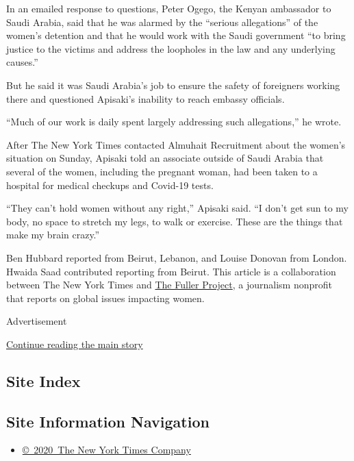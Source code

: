 In an emailed response to questions, Peter Ogego, the Kenyan ambassador
to Saudi Arabia, said that he was alarmed by the ``serious allegations''
of the women's detention and that he would work with the Saudi
government ``to bring justice to the victims and address the loopholes
in the law and any underlying causes.''

But he said it was Saudi Arabia's job to ensure the safety of foreigners
working there and questioned Apisaki's inability to reach embassy
officials.

``Much of our work is daily spent largely addressing such allegations,''
he wrote.

After The New York Times contacted Almuhait Recruitment about the
women's situation on Sunday, Apisaki told an associate outside of Saudi
Arabia that several of the women, including the pregnant woman, had been
taken to a hospital for medical checkups and Covid-19 tests.

``They can't hold women without any right,'' Apisaki said. ``I don't get
sun to my body, no space to stretch my legs, to walk or exercise. These
are the things that make my brain crazy.''

Ben Hubbard reported from Beirut, Lebanon, and Louise Donovan from
London. Hwaida Saad contributed reporting from Beirut. This article is a
collaboration between The New York Times and
\href{https://fullerproject.org/}{The Fuller Project}, a journalism
nonprofit that reports on global issues impacting women.

Advertisement

\protect\hyperlink{after-bottom}{Continue reading the main story}

\hypertarget{site-index}{%
\subsection{Site Index}\label{site-index}}

\hypertarget{site-information-navigation}{%
\subsection{Site Information
Navigation}\label{site-information-navigation}}

\begin{itemize}
\tightlist
\item
  \href{https://help.nytimes.com/hc/en-us/articles/115014792127-Copyright-notice}{©~2020~The
  New York Times Company}
\end{itemize}

